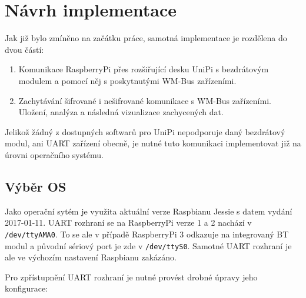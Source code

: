 \chapter{Návrh implementace}
Jak již bylo zmíněno na začátku práce, samotná implementace je rozdělena do dvou částí:
\begin{enumerate}
	\item Komunikace RaspberryPi přes rozšiřující desku UniPi s bezdrátovým modulem a pomocí něj s poskytnutými WM-Bus zařízeními.
	\item Zachytávání šifrované i nešifrované komunikace s WM-Bus zařízeními. Uložení, analýza a následná vizualizace zachycených dat. 
\end{enumerate}

Jelikož žádný z dostupných softwarů pro UniPi nepodporuje daný bezdrátový modul, ani UART zařízení obecně, je nutné tuto komunikaci implementovat již na úrovni operačního systému.


\section{Výběr OS}
Jako operační sytém je využita aktuální verze Raspbianu Jessie s datem vydání 2017-01-11. UART rozhraní se na RaspberryPi verze 1 a 2 nachází v \texttt{/dev/ttyAMA0}. To se ale v případě RaspberryPi 3 odkazuje na integrovaný BT modul a původní sériový port je zde v \texttt{/dev/ttyS0}. Samotné UART rozhraní je ale ve výchozím nastavení Raspbianu zakázáno.

Pro zpřístupnění UART rozhraní je nutné provést drobné úpravy jeho konfigurace:


